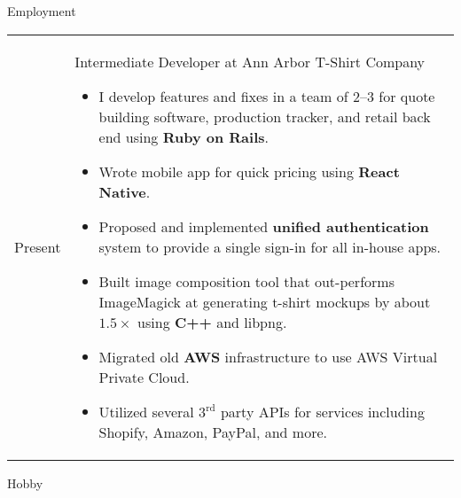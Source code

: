 \documentclass[11pt]{article}
\renewcommand{\section}[1]{{\Huge{#1}}\vspace{2 mm}}
\newenvironment{timeline}
        {\begin{tabular}{p{21 mm}|p{150 mm}}}
        {\end{tabular}}
\newenvironment{timelinetitle}
        {\vspace{-2 mm}\begin{large}}
        {\end{large}\vspace{-1.5 mm}}
\newcommand{\timespan}[2]{{#2}\newline{#1}}
\begin{document}
\vspace{3.0 mm}
\section{Employment}

\begin{timeline}
\timespan{Winter 2014}{Present}
&
\begin{timelinetitle}
    Intermediate Developer at Ann Arbor T-Shirt Company
\end{timelinetitle}
\begin{itemize}
  \item I develop features and fixes in a team of 2--3 for quote building software,
        production tracker, and retail back end using \textbf{Ruby on Rails}.

  \item Wrote mobile app for quick pricing using \textbf{React Native}.

  \item Proposed and implemented \textbf{unified authentication} system to provide a single sign-in for all in-house apps.

  \item Built image composition tool that out-performs ImageMagick
        at generating t-shirt mockups by about $1.5\times$ using \textbf{C++} and libpng.

  \item Migrated old \textbf{AWS} infrastructure to use AWS Virtual Private Cloud.
  
  \item Utilized several $3^\text{rd}$ party APIs for services including Shopify, Amazon, PayPal, and more.

\end{itemize}

\end{timeline}

\vspace{3.0 mm}
\section{Hobby}
\end{document}
